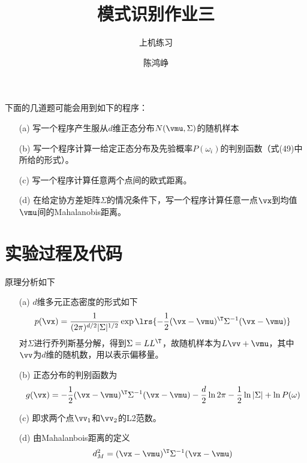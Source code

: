 \documentclass[reportComp]{thesis}
\title{模式识别作业三}
\subtitle{上机练习}
\author{陈鸿峥}
\begin{document}
\maketitle

\begin{question}[\textsection 2.5 Q1]
下面的几道题可能会用到如下的程序：
\begin{itemize}
	\item [(a)] 写一个程序产生服从$d$维正态分布$N(\vmu,\Sigma)$的随机样本
	\item [(b)] 写一个程序计算一给定正态分布及先验概率$P(\omega_i)$的判别函数（式(49)中所给的形式）。
	\item [(c)] 写一个程序计算任意两个点间的欧式距离。
	\item [(d)] 在给定协方差矩阵$\Sigma$的情况条件下，写一个程序计算任意一点$\vx$到均值$\vmu$间的Mahalanobis距离。
\end{itemize}
\end{question}

\section{实验过程及代码}
原理分析如下
\begin{itemize}
	\item [(a)] $d$维多元正态密度的形式如下
	\[p(\vx)=\frac{1}{(2\pi)^{d/2}|\Sigma|^{1/2}}\exp\lrs{-\frac{1}{2}(\vx-\vmu)^\T\Sigma^{-1}(\vx-\vmu)}\]
	对$\Sigma$进行乔列斯基分解，得到$\Sigma=L L^\T$，故随机样本为$L\vv+\vmu$，其中$\vv$为$d$维的随机数，用以表示偏移量。
	\item [(b)] 正态分布的判别函数为
	\[g(\vx)=-\frac{1}{2}(\vx-\vmu)^\T\Sigma^{-1}(\vx-\vmu)-\frac{d}{2}\ln 2\pi-\frac{1}{2}\ln|\Sigma|+\ln P(\omega)\]
	\item [(c)] 即求两个点$\vv_1$和$\vv_2$的L2范数。
	\item [(d)] 由Mahalanbois距离的定义
	\[d_M^2=(\vx-\vmu)^\T\Sigma^{-1}(\vx-\vmu)\]
\end{itemize}
\end{document}
